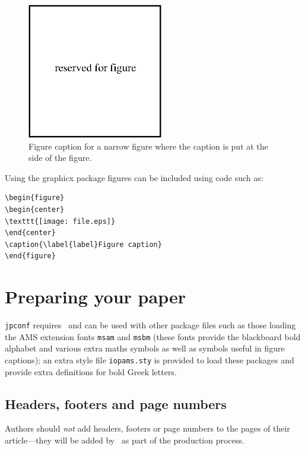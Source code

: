\documentclass[a4paper]{jpconf}
\begin{document}
\begin{figure}[h]
\includegraphics[width=14pc]{name.eps}\hspace{2pc}%
\begin{minipage}[b]{14pc}\caption{\label{label}Figure caption for a narrow figure where the caption is put at the side of the figure.}
\end{minipage}
\end{figure}

Using the graphicx package figures can be included using code such as:
\begin{verbatim}
\begin{figure}
\begin{center}
\texttt{[image: file.eps]}
\end{center}
\caption{\label{label}Figure caption}
\end{figure}
\end{verbatim}


\section{Preparing your paper}
\verb"jpconf" requires \LaTeXe\ and  can be used with other package files such
as those loading the AMS extension fonts 
\verb"msam" and \verb"msbm" (these fonts provide the 
blackboard bold alphabet and various extra maths symbols as well as 
symbols useful in figure captions); an extra style file \verb"iopams.sty" is 
provided to load these packages and provide extra definitions for bold Greek letters. 
\subsection{Headers, footers and page numbers}
Authors should {\it not} add headers, footers or page numbers to the pages of their article---they will
be added by \iopp\ as part of the production process.
\end{document}
